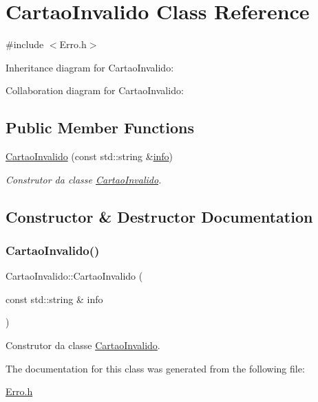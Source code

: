 \hypertarget{class_cartao_invalido}{}\section{Cartao\+Invalido Class Reference}
\label{class_cartao_invalido}


{\ttfamily \#include $<$Erro.\+h$>$}



Inheritance diagram for Cartao\+Invalido\+:


Collaboration diagram for Cartao\+Invalido\+:
\subsection*{Public Member Functions}
\begin{DoxyCompactItemize}
\item 
\mbox{\hyperlink{class_cartao_invalido_a24653e20aedf639b42cd9ed8a56bdc83}{Cartao\+Invalido}} (const std\+::string \&\mbox{\hyperlink{class_erro_a3ecaaf6f8e15a0830a648035b456cb62}{info}})
\begin{DoxyCompactList}\small\item\em Construtor da classe \mbox{\hyperlink{class_cartao_invalido}{Cartao\+Invalido}}. \end{DoxyCompactList}\end{DoxyCompactItemize}


\subsection{Constructor \& Destructor Documentation}
\mbox{\label{class_cartao_invalido_a24653e20aedf639b42cd9ed8a56bdc83}} 
\subsubsection{\texorpdfstring{Cartao\+Invalido()}{CartaoInvalido()}}
{\footnotesize\ttfamily Cartao\+Invalido\+::\+Cartao\+Invalido (\begin{DoxyParamCaption}\item[{const std\+::string \&}]{info }\end{DoxyParamCaption})\hspace{0.3cm}{\ttfamily [inline]}}



Construtor da classe \mbox{\hyperlink{class_cartao_invalido}{Cartao\+Invalido}}. 



The documentation for this class was generated from the following file\+:\begin{DoxyCompactItemize}
\item 
\mbox{\hyperlink{_erro_8h}{Erro.\+h}}\end{DoxyCompactItemize}
